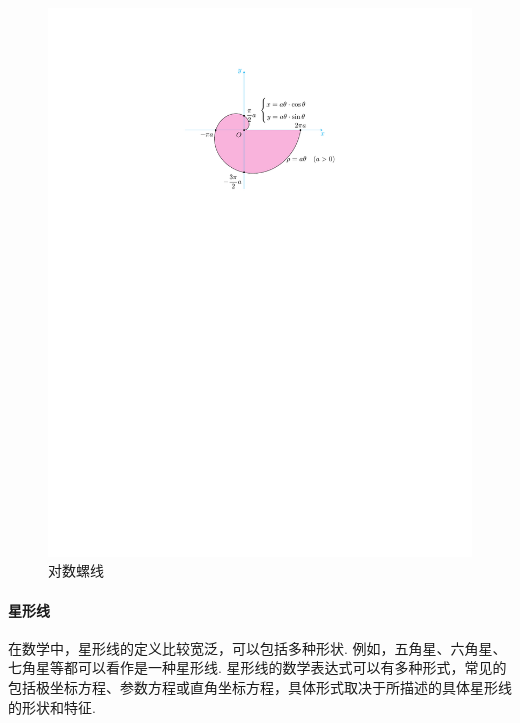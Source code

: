 \begin{figure}[H]
    \centering
    \includegraphics{figures/ArchimedesSpiral.pdf}
    \caption{对数螺线}
    \label{archimedesSpiral}
\end{figure}

\paragraph{星形线}

在数学中，星形线的定义比较宽泛，可以包括多种形状. 例如，五角星、六角星、七角星等都可以看作是一种星形线. 星形线的数学表达式可以有多种形式，常见的包括极坐标方程、参数方程或直角坐标方程，具体形式取决于所描述的具体星形线的形状和特征. 

